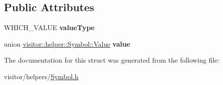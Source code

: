 \subsection*{Public Attributes}
\begin{DoxyCompactItemize}
\item 
\mbox{\label{structvisitor_1_1helper_1_1Symbol_aebb6af7f12ef493c13e092b9e0072456}} 
W\+H\+I\+C\+H\+\_\+\+V\+A\+L\+UE {\bfseries value\+Type}
\item 
\mbox{\label{structvisitor_1_1helper_1_1Symbol_a406184b57090559b32bb06ffc7717324}} 
union \hyperlink{unionvisitor_1_1helper_1_1Symbol_1_1Value}{visitor\+::helper\+::\+Symbol\+::\+Value} {\bfseries value}
\end{DoxyCompactItemize}


The documentation for this struct was generated from the following file\+:\begin{DoxyCompactItemize}
\item 
visitor/helpers/\hyperlink{Symbol_8h}{Symbol.\+h}\end{DoxyCompactItemize}
